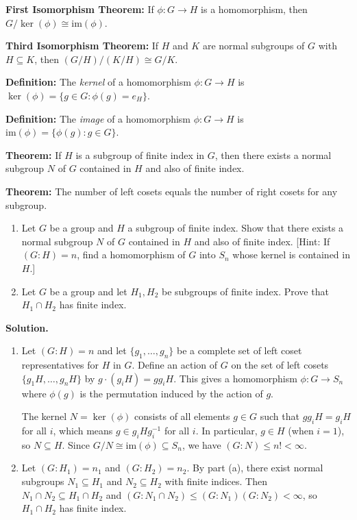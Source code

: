 \textbf{First Isomorphism Theorem:} If $\phi: G \to H$ is a homomorphism, then $G/\ker(\phi) \cong \text{im}(\phi)$.

\textbf{Third Isomorphism Theorem:} If $H$ and $K$ are normal subgroups of $G$ with $H \subseteq K$, then $(G/H)/(K/H) \cong G/K$.

\textbf{Definition:} The \textit{kernel} of a homomorphism $\phi: G \to H$ is $\ker(\phi) = \{g \in G : \phi(g) = e_H\}$.

\textbf{Definition:} The \textit{image} of a homomorphism $\phi: G \to H$ is $\text{im}(\phi) = \{\phi(g) : g \in G\}$.

\textbf{Theorem:} If $H$ is a subgroup of finite index in $G$, then there exists a normal subgroup $N$ of $G$ contained in $H$ and also of finite index.

\textbf{Theorem:} The number of left cosets equals the number of right cosets for any subgroup.

\begin{problembox}
\begin{enumerate}[label=(\alph*)]
\item Let $G$ be a group and $H$ a subgroup of finite index. Show that there exists a normal subgroup $N$ of $G$ contained in $H$ and also of finite index. [Hint: If $(G : H) = n$, find a homomorphism of $G$ into $S_n$ whose kernel is contained in $H$.]
\item Let $G$ be a group and let $H_1, H_2$ be subgroups of finite index. Prove that $H_1 \cap H_2$ has finite index.
\end{enumerate}
\end{problembox}

\noindent\textbf{Solution.}
\begin{enumerate}[label=(\alph*)]
\item Let $(G : H) = n$ and let $\{g_1, \ldots, g_n\}$ be a complete set of left coset representatives for $H$ in $G$. Define an action of $G$ on the set of left cosets $\{g_1H, \ldots, g_nH\}$ by $g \cdot (g_iH) = gg_iH$. This gives a homomorphism $\phi: G \to S_n$ where $\phi(g)$ is the permutation induced by the action of $g$.

The kernel $N = \ker(\phi)$ consists of all elements $g \in G$ such that $gg_iH = g_iH$ for all $i$, which means $g \in g_iHg_i^{-1}$ for all $i$. In particular, $g \in H$ (when $i = 1$), so $N \subseteq H$. Since $G/N \cong \text{im}(\phi) \subseteq S_n$, we have $(G : N) \leq n! < \infty$.

\item Let $(G : H_1) = n_1$ and $(G : H_2) = n_2$. By part (a), there exist normal subgroups $N_1 \subseteq H_1$ and $N_2 \subseteq H_2$ with finite indices. Then $N_1 \cap N_2 \subseteq H_1 \cap H_2$ and $(G : N_1 \cap N_2) \leq (G : N_1)(G : N_2) < \infty$, so $H_1 \cap H_2$ has finite index.
\end{enumerate}

